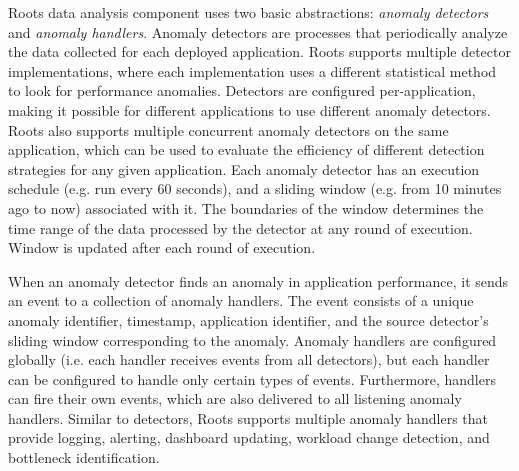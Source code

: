 Roots data analysis component uses two basic abstractions: \textit{anomaly detectors} 
and \textit{anomaly handlers}.
Anomaly detectors are processes that periodically analyze the data collected for
each deployed application. Roots supports multiple detector implementations, where each implementation
uses a different statistical method to look for performance anomalies. Detectors are configured
per-application, making it possible for different applications to use different anomaly 
detectors. Roots also supports multiple concurrent anomaly detectors on the same application, which can be used
to evaluate the efficiency of different detection strategies for any given application. Each
anomaly detector has an execution schedule (e.g. run every 60 seconds), and a sliding window 
(e.g. from 10 minutes ago to now)
associated with it. The boundaries of the window determines the time range
of the data processed by the detector at any round of execution. Window is updated 
after each round of execution. 

When an anomaly detector finds an anomaly in application performance, it sends an event
to a collection of anomaly handlers. The event consists of a unique anomaly identifier, 
timestamp, application identifier, and the source detector's sliding window corresponding to the
anomaly. Anomaly handlers are configured globally (i.e. each handler
receives events from all detectors), but each handler can be configured to handle only
certain types of events. Furthermore, handlers can fire their own events, which are also delivered to
all listening anomaly handlers. Similar to detectors, Roots supports multiple anomaly handlers
that provide logging, alerting, dashboard updating, 
workload change detection, and bottleneck identification.



